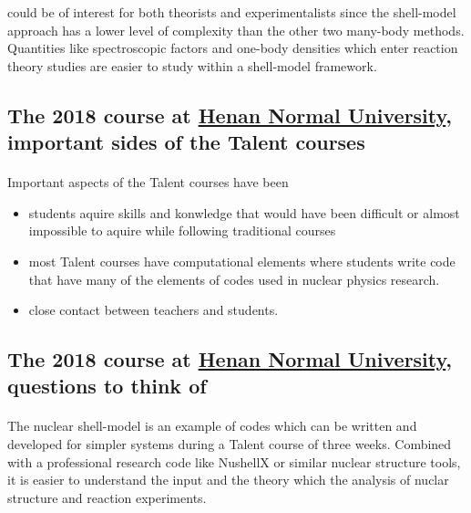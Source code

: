 \documentclass[%
oneside,                 %
final,                   %
10pt]{article}
\begin{document}
\noindent
could be of interest for both theorists and experimentalists since the shell-model approach has a lower level of complexity than the other two many-body methods.
Quantities like spectroscopic factors and one-body densities which enter reaction theory studies are easier to study within a shell-model framework.




\subsection*{The 2018 course at \href{{http://www.htu.cn/english/}}{Henan Normal University}, important sides of the Talent courses}

\paragraph{}
Important aspects of the Talent courses have been
\begin{itemize}
\item students aquire skills and konwledge that would have been difficult or almost impossible to aquire while following traditional courses

\item most Talent courses have computational elements where students write code that have many of the elements of codes used in nuclear physics research.

\item close contact between teachers and students. 
\end{itemize}

\noindent




\subsection*{The 2018 course at \href{{http://www.htu.cn/english/}}{Henan Normal University}, questions to think of}

\paragraph{}

The nuclear shell-model is an example of codes which can be written and developed for simpler systems during a Talent course of three weeks. Combined with a professional research code like NushellX or similar nuclear structure tools, it is easier to understand the input and the theory which the analysis of nuclar structure and reaction experiments. 
\end{document}
